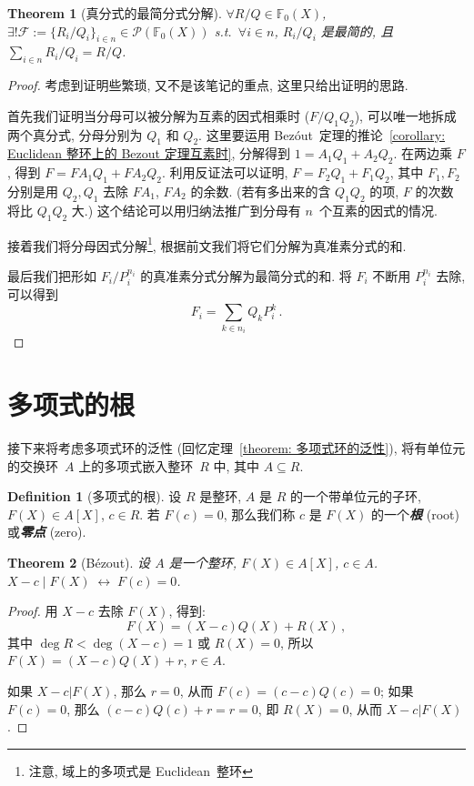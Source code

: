 \documentclass[openany]{ctexbook}
\newcommand*{\indexbf}[1]{\emph{\textbf{#1}}\index{#1}} %
\theoremstyle{plain}
\newtheorem{theorem}{Theorem}[section] %
\theoremstyle{definition}
\newtheorem{definition}{Definition}[section] %
\newcommand*{\IFF}{\;\leftrightarrow\;} %
\begin{document}
\begin{theorem}[真分式的最简分式分解]
	$\forall R/Q \in \mathbb F_0(X)$, $\exists! \mathscr F:=\{R_i/Q_i\}_{i \in n} \in \mathscr P(\mathbb F_0(X))$ s.t.\ $\forall i \in n$, $R_i/Q_i$ 是最简的, 且 $\sum_{i \in n} R_i/Q_i = R/Q$.
\end{theorem}
\begin{proof}
	考虑到证明些繁琐, 又不是该笔记的重点, 这里只给出证明的思路. 
	
	首先我们证明当分母可以被分解为互素的因式相乘时 ($F / Q_1 Q_2$), 可以唯一地拆成两个真分式, 分母分别为 $Q_1$ 和 $Q_2$. 
	这里要运用 Bez\'out~定理的推论~\ref{corollary: Euclidean 整环上的 Bezout 定理互素时}, 
	分解得到 $1 = A_1 Q_1 + A_2 Q_2$. 
	在两边乘 $F$, 得到 $F = F A_1 Q_1 + F A_2 Q_2$. 
	利用反证法可以证明, $F = F_2 Q_1 + F_1 Q_2$, 其中 $F_1, F_2$ 分别是用 $Q_2, Q_1$ 去除 $F A_1$, $F A_2$ 的余数. (若有多出来的含 $Q_1Q_2$ 的项, $F$ 的次数将比 $Q_1 Q_2$ 大.) 这个结论可以用归纳法推广到分母有 $n$~个互素的因式的情况.
	
	接着我们将分母因式分解\footnote{注意, 域上的多项式是 Euclidean~整环}, 根据前文我们将它们分解为真准素分式的和.

	最后我们把形如 $F_i/P_i^{n_i}$ 的真准素分式分解为最简分式的和. 将 $F_i$ 不断用 $P_i^{n_i}$ 去除, 可以得到
	\begin{equation*}
		F_i = \sum_{k \in n_i} Q_k P_i^k\,.
	\end{equation*}
\end{proof}

\section{多项式的根}

接下来将考虑多项式环的泛性 (回忆定理~\ref{theorem: 多项式环的泛性}), 将有单位元的交换环~$A$ 上的多项式嵌入整环~$R$ 中, 其中 $A \subseteq R$. 

\begin{definition}[多项式的根]
	设 $R$ 是整环, $A$ 是 $R$ 的一个带单位元的子环, $F(X) \in A[X]$, $c \in R$.
	若 $F(c) = 0$, 那么我们称 $c$ 是 $F(X)$ 的一个\indexbf{根} (root) 或\indexbf{零点} (zero).
\end{definition}

\begin{theorem}[B\'ezout]\label{theorem: Bezout}
	设 $A$ 是一个整环, $F(X) \in A[X]$, $c \in A$.
	$X - c \mid F(X) \IFF F(c) = 0$. 
\end{theorem}
\begin{proof}
	用 $X - c$ 去除 $F(X)$, 得到:
	\begin{equation*}
		F(X) = (X - c) Q(X) + R(X)\,,
	\end{equation*}
	其中 $\deg R < \deg(X - c) = 1$ 或 $R(X) = 0$, 所以 $F(X) = (X - c) Q(X) + r$, $r \in A$.

	如果 $X - c \vert F(X)$, 那么 $r = 0$, 从而 $F(c) = (c - c) Q(c) = 0$; 如果 $F(c) = 0$, 那么 $(c - c)Q(c) + r = r = 0$, 即 $R(X) = 0$, 从而 $X - c \vert F(X)$.
\end{proof}
\end{document}
